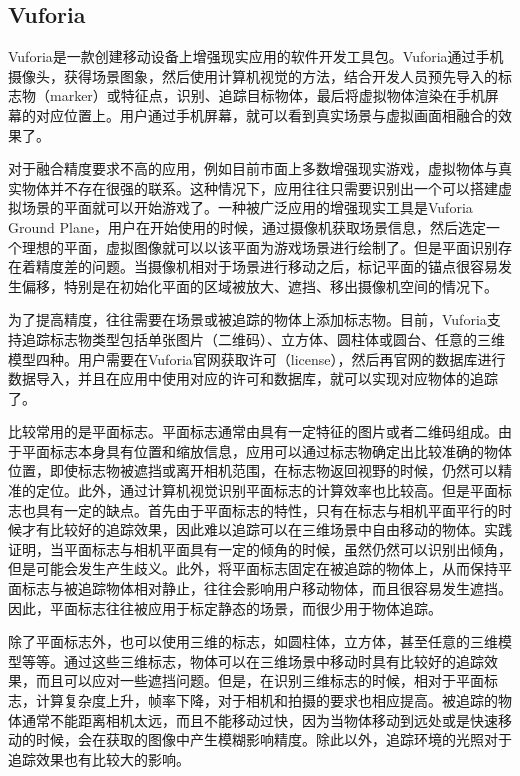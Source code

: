 \subsection{Vuforia}
	Vuforia\cite{Vuforia}是一款创建移动设备上增强现实应用的软件开发工具包。Vuforia通过手机摄像头，获得场景图象，然后使用计算机视觉的方法，结合开发人员预先导入的标志物（marker）或特征点，识别、追踪目标物体，最后将虚拟物体渲染在手机屏幕的对应位置上。用户通过手机屏幕，就可以看到真实场景与虚拟画面相融合的效果了。
	
对于融合精度要求不高的应用，例如目前市面上多数增强现实游戏，虚拟物体与真实物体并不存在很强的联系。这种情况下，应用往往只需要识别出一个可以搭建虚拟场景的平面就可以开始游戏了。一种被广泛应用的增强现实工具是Vuforia Ground Plane\cite{VuforiaGround}，用户在开始使用的时候，通过摄像机获取场景信息，然后选定一个理想的平面，虚拟图像就可以以该平面为游戏场景进行绘制了。但是平面识别存在着精度差的问题。当摄像机相对于场景进行移动之后，标记平面的锚点很容易发生偏移，特别是在初始化平面的区域被放大、遮挡、移出摄像机空间的情况下。

	为了提高精度，往往需要在场景或被追踪的物体上添加标志物。目前，Vuforia支持追踪标志物类型包括单张图片（二维码）、立方体、圆柱体或圆台、任意的三维模型四种。用户需要在Vuforia官网获取许可（license），然后再官网的数据库进行数据导入，并且在应用中使用对应的许可和数据库，就可以实现对应物体的追踪了。
	
比较常用的是平面标志。平面标志通常由具有一定特征的图片或者二维码组成。由于平面标志本身具有位置和缩放信息，应用可以通过标志物确定出比较准确的物体位置，即使标志物被遮挡或离开相机范围，在标志物返回视野的时候，仍然可以精准的定位。此外，通过计算机视觉识别平面标志的计算效率也比较高。但是平面标志也具有一定的缺点。首先由于平面标志的特性，只有在标志与相机平面平行的时候才有比较好的追踪效果，因此难以追踪可以在三维场景中自由移动的物体。实践证明，当平面标志与相机平面具有一定的倾角的时候，虽然仍然可以识别出倾角，但是可能会发生产生歧义。此外，将平面标志固定在被追踪的物体上，从而保持平面标志与被追踪物体相对静止，往往会影响用户移动物体，而且很容易发生遮挡。因此，平面标志往往被应用于标定静态的场景，而很少用于物体追踪。

除了平面标志外，也可以使用三维的标志，如圆柱体，立方体，甚至任意的三维模型等等。通过这些三维标志，物体可以在三维场景中移动时具有比较好的追踪效果，而且可以应对一些遮挡问题。但是，在识别三维标志的时候，相对于平面标志，计算复杂度上升，帧率下降，对于相机和拍摄的要求也相应提高。被追踪的物体通常不能距离相机太远，而且不能移动过快，因为当物体移动到远处或是快速移动的时候，会在获取的图像中产生模糊影响精度。除此以外，追踪环境的光照对于追踪效果也有比较大的影响。

